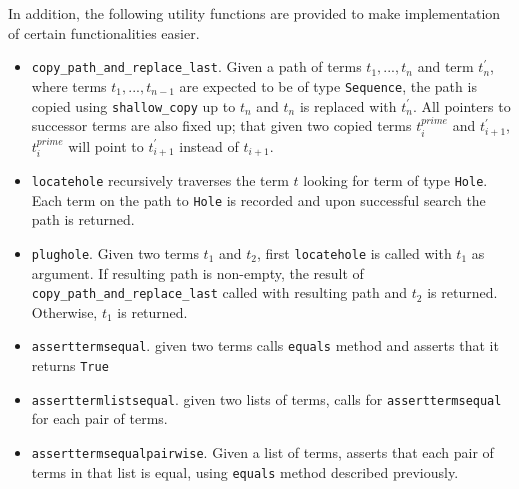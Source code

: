 In addition, the following utility functions are provided to make implementation of certain functionalities easier.

\begin{itemize}
\item
	\texttt{copy\_path\_and\_replace\_last}. Given a path of terms $t_1, ..., t_n$ and term $t_n^{\prime}$, where terms $t_1, ..., t_{n-1}$ are expected to be of type \texttt{Sequence}, the path is copied using \texttt{shallow\_copy} up to $t_n$ and $t_n$ is replaced with $t_n^{\prime}$. All pointers to successor terms are also fixed up; that given two copied terms $t_i^{prime}$ and $t_{i+1}^{\prime}$, $t_i^{prime}$ will point to $t_{i+1}^{\prime}$ instead of $t_{i+1}$.
\item
	\texttt{locatehole} recursively traverses the term $t$ looking for term of type \texttt{Hole}. Each term on the path to \texttt{Hole} is recorded and upon successful search the path is returned.
\item
	\texttt{plughole}. Given two terms $t_1$ and $t_2$, first \texttt{locatehole} is called with $t_1$ as argument. If resulting path is non-empty, the result of \texttt{copy\_path\_and\_replace\_last} called with resulting path and $t_2$ is returned. Otherwise, $t_1$ is returned.
\item
	\texttt{asserttermsequal}. given two terms calls \texttt{equals} method and asserts that it returns \texttt{True}
\item
	\texttt{asserttermlistsequal}. given two lists of terms, calls for \texttt{asserttermsequal} for each pair of terms.
\item 
	\texttt{asserttermsequalpairwise}. Given a list of terms, asserts that each pair of terms in that list is equal, using \texttt{equals} method described previously.
\end{itemize}
